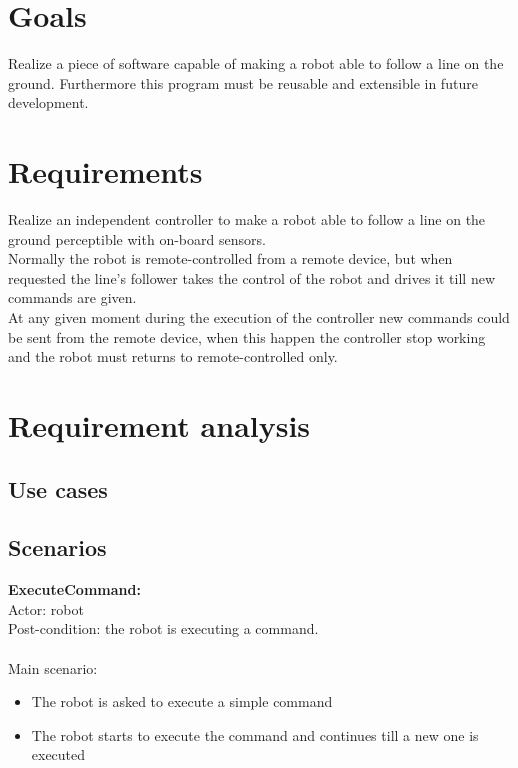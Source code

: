 \documentclass{llncs}
\newcommand{\labelsec}[1]{\label{sec:#1}}
\newcommand{\labelssec}[1]{\label{ssec:#1}}
\begin{document}
\section{Goals}
\labelsec{Goals}
Realize a piece of software capable of making a robot able to follow a line on the ground. Furthermore this program must be reusable and extensible in future development. \\ 

\section{Requirements}
\labelsec{Requirements}
Realize an independent controller to make a robot able to follow a line on the ground perceptible with on-board sensors.\\
Normally the robot is remote-controlled from a remote device, but when requested the line's follower takes the control of the robot and drives it till new commands are given. \\
At any given moment during the execution of the controller new commands could be sent from the remote device, when this happen the controller stop working and the robot must returns to remote-controlled only.

 
\section{Requirement analysis}
\labelsec{ReqAnalysis}

\subsection{Use cases}
\labelssec{UseCases}
\begin{center}
\end{center}

\subsection{Scenarios}
\labelssec{Scenarios}
\textbf{ExecuteCommand:}\\
Actor: robot\\
Post-condition: the robot is executing a command.\\
\\
Main scenario:
\begin{itemize}
	\item The robot is asked to execute a simple command
	\item The robot starts to execute the command and continues till a new one is executed
\end{itemize}
 
\end{document}
